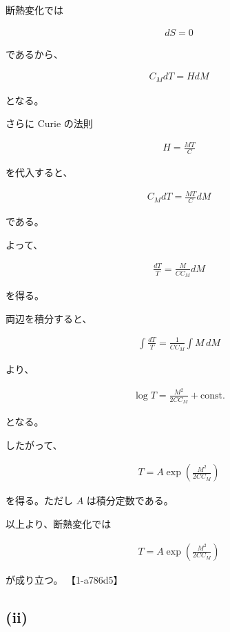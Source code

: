 \documentclass[platex,dvipdfmx,a4paper]{jsarticle}
\begin{document}
断熱変化では

\begin{align*}
dS=0
\end{align*}

であるから、

\begin{align*}
C_MdT
=
HdM
\end{align*}

となる。

さらに Curie の法則

\begin{align*}
H=\frac{MT}{C}
\end{align*}

を代入すると、

\begin{align*}
C_MdT
=
\frac{MT}{C}dM
\end{align*}

である。

よって、

\begin{align*}
\frac{dT}{T}
=
\frac{M}{CC_M}dM
\end{align*}

を得る。

両辺を積分すると、

\begin{align*}
\int\frac{dT}{T}
=
\frac{1}{CC_M}
\int M\,dM
\end{align*}

より、

\begin{align*}
\log T
=
\frac{M^2}{2CC_M}
+\mathrm{const.}
\end{align*}

となる。

したがって、

\begin{align*}
T
=
A
\exp\left(
\frac{M^2}{2CC_M}
\right)
\end{align*}

を得る。ただし $A$ は積分定数である。

以上より、断熱変化では

\begin{align*}
T
=
A
\exp\left(
\frac{M^2}{2CC_M}
\right)
\end{align*}

が成り立つ。 【1-a786d5】

\subsection{(ii)}
\end{document}
